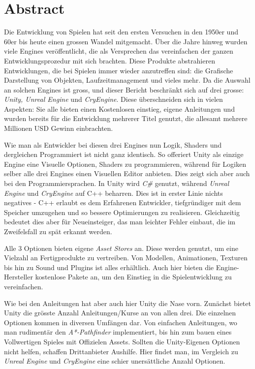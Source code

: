 

\cleardoublepage
\chapter*{Abstract}
\par Die Entwicklung von Spielen hat seit den ersten Versuchen in den 1950er und 60er bis heute einen grossen Wandel mitgemacht. Über die Jahre hinweg wurden viele Engines veröffentlicht, die als Versprechen das vereinfachen der
ganzen Entwicklungsprozedur mit sich brachten. Diese Produkte abstrahieren Entwicklungen, die bei Spielen immer wieder anzutreffen sind: die Grafische Darstellung von Objekten, Laufzeitmanagement und vieles mehr. Da die Auswahl an solchen Engines ist gross, und dieser Bericht beschränkt sich auf drei grosse: \emph{Unity, Unreal Engine} und \emph{CryEngine}. Diese überschneiden sich in vielen Aspekten: Sie alle bieten einen Kostenlosen einstieg, eigene Anleitungen und wurden bereits für die Entwicklung mehrerer Titel genutzt, die allesamt mehrere Millionen USD Gewinn einbrachten.

\par Wie man als Entwickler bei diesen drei Engines nun Logik, Shaders und dergleichen Programmiert ist nicht ganz identisch. So offeriert Unity als einzige Engine eine Visuelle Optionen, Shaders zu programmieren, während für Logiken selber alle drei Engines einen Visuellen Editor anbieten. Dies zeigt sich aber auch bei den Programmiersprachen. In Unity wird \emph{C\#} genutzt, während \emph{Unreal Engine} und \emph{CryEngine} auf C++ beharren. Dies ist in erster Linie nichts negatives - C++ erlaubt es dem Erfahrenen Entwickler, tiefgründiger mit dem Speicher umzugehen und so bessere Optimierungen zu realisieren. Gleichzeitig bedeutet dies aber für Neueinsteiger, das man leichter Fehler einbaut, die im Zweifelsfall zu spät erkannt werden.

\par Alle 3 Optionen bieten eigene \emph{Asset Stores} an. Diese werden genutzt, um eine Vielzahl an Fertigprodukte zu vertreiben. Von Modellen, Animationen, Texturen bis hin zu Sound und Plugins ist alles erhältlich. Auch hier bieten die Engine-Hersteller kostenlose Pakete an, um den Einstieg in die Spielentwicklung zu vereinfachen.

\par Wie bei den Anleitungen hat aber auch hier Unity die Nase vorn. Zunächst bietet Unity die grösste Anzahl Anleitungen/Kurse an von allen drei. Die einzelnen Optionen kommen in diversen Umfängen dar. Von einfachen Anleitungen, wo man rudimentär den \emph{A*-Pathfinder} implementiert, bis hin zum bauen eines Vollwertigen Spieles mit Offizielen Assets. Sollten die Unity-Eigenen Optionen nicht helfen, schaffen Drittanbieter Aushilfe. Hier findet man, im Vergleich zu \emph{Unreal Engine} und \emph{CryEngine} eine schier unersättliche Anzahl Optionen. 

